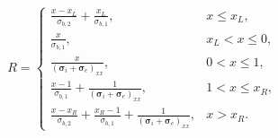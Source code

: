 $$
R = \begin{cases}
\frac{x - x_L}{\sigma_{b,2}} + \frac{x_L}{\sigma_{b,1}}, & x\le x_L,\\
\frac{x}{\sigma_{b,1}}, & x_L<x\le 0,\\
\frac{x}{(\boldsymbol\sigma_i+\boldsymbol\sigma_e)_{xx}}, & 0<x\le 1,\\
\frac{x - 1}{\sigma_{b,1}} + \frac{1}{(\boldsymbol\sigma_i+\boldsymbol\sigma_e)_{xx}}, & 1<x\le x_R,\\
\frac{x - x_R}{\sigma_{b,2}} + \frac{x_R - 1}{\sigma_{b,1}} + \frac{1}{(\boldsymbol\sigma_i+\boldsymbol\sigma_e)_{xx}}, & x>x_R.
\end{cases}
$$

